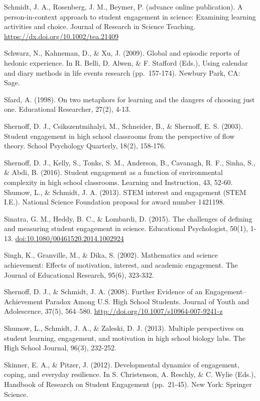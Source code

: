 \documentclass[]{msu-thesis}
\theoremstyle{definition}
\theoremstyle{definition}
\theoremstyle{definition}
\theoremstyle{remark}
\begin{document}
Schmidt, J. A., Rosenberg, J. M., Beymer, P. (advance online
publication). A person-in-context approach to student engagement in
science: Examining learning activities and choice. Journal of Research
in Science Teaching. \url{https://dx.doi.org/10.1002/tea.21409}

Schwarz, N., Kahneman, D., \& Xu, J. (2009). Global and episodic reports
of hedonic experience. In R. Belli, D. Alwen, \& F. Stafford (Eds.),
Using calendar and diary methods in life events research (pp.~157-174).
Newbury Park, CA: Sage.

Sfard, A. (1998). On two metaphors for learning and the dangers of
choosing just one. Educational Researcher, 27(2), 4-13.

Shernoff, D. J., Csikszentmihalyi, M., Schneider, B., \& Shernoff, E. S.
(2003). Student engagement in high school classrooms from the
perspective of flow theory. School Psychology Quarterly, 18(2), 158-176.

Shernoff, D. J., Kelly, S., Tonks, S. M., Anderson, B., Cavanagh, R. F.,
Sinha, S., \& Abdi, B. (2016). Student engagement as a function of
environmental complexity in high school classrooms. Learning and
Instruction, 43, 52-60.\\
Shumow, L., \& Schmidt, J. A. (2013). STEM interest and engagement (STEM
I.E.). National Science Foundation proposal for award number 1421198.

Sinatra, G. M., Heddy, B. C., \& Lombardi, D. (2015). The challenges of
defining and measuring student engagement in science. Educational
Psychologist, 50(1), 1-13. \url{doi:10.1080/00461520.2014.1002924}

Singh, K., Granville, M., \& Dika, S. (2002). Mathematics and science
achievement: Effects of motivation, interest, and academic engagement.
The Journal of Educational Research, 95(6), 323-332.

Shernoff, D. J., \& Schmidt, J. A. (2008). Further Evidence of an
Engagement--Achievement Paradox Among U.S. High School Students. Journal
of Youth and Adolescence, 37(5), 564--580.
\url{http://doi.org/10.1007/s10964-007-9241-z}

Shumow, L., Schmidt, J. A., \& Zaleski, D. J. (2013). Multiple
perspectives on student learning, engagement, and motivation in high
school biology labs. The High School Journal, 96(3), 232-252.

Skinner, E. A., \& Pitzer, J. (2012). Developmental dynamics of
engagement, coping, and everyday resilience. In S. Christenson, A.
Reschly, \& C. Wylie (Eds.), Handbook of Research on Student Engagement
(pp.~21-45). New York: Springer Science.
\end{document}
